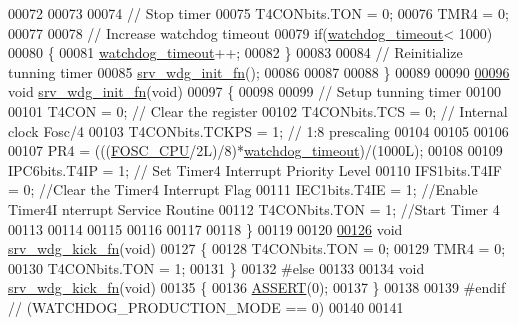 \begin{DoxyCode}
00072 
00073 
00074     \textcolor{comment}{// Stop timer}
00075     T4CONbits.TON = 0;
00076     TMR4          = 0;  
00077     
00078     \textcolor{comment}{// Increase watchdog timeout}
00079     \textcolor{keywordflow}{if}(\hyperlink{a00066_a159d343205105c86a6dec5da26cfdfe0}{watchdog\_timeout}< 1000)
00080     \{
00081         \hyperlink{a00066_a159d343205105c86a6dec5da26cfdfe0}{watchdog\_timeout}++;
00082     \}
00083 
00084     \textcolor{comment}{// Reinitialize tunning timer}
00085     \hyperlink{a00066_a37c35718860234f09b8cef8680e1cc09}{srv\_wdg\_init\_fn}();
00086 
00087     
00088 \}
00089 
00090 
\hypertarget{a00066_source_l00096}{}\hyperlink{a00066_a37c35718860234f09b8cef8680e1cc09}{00096} \textcolor{keywordtype}{void} \hyperlink{a00066_a37c35718860234f09b8cef8680e1cc09}{srv\_wdg\_init\_fn}(\textcolor{keywordtype}{void})
00097 \{
00098 
00099     \textcolor{comment}{// Setup tunning timer}
00100     
00101     T4CON = 0;                    \textcolor{comment}{// Clear the register}
00102     T4CONbits.TCS    = 0;         \textcolor{comment}{// Internal clock Fosc/4   }
00103     T4CONbits.TCKPS = 1;          \textcolor{comment}{//    1:8 prescaling    }
00104 
00105 
00106 
00107     PR4 = (((\hyperlink{a00072_a64b7f2fd4683ad3dcd74ccab1eba40d7}{FOSC\_CPU}/2L)/8)*\hyperlink{a00066_a159d343205105c86a6dec5da26cfdfe0}{watchdog\_timeout})/(1000L); 
00108     
00109     IPC6bits.T4IP = 1;            \textcolor{comment}{// Set Timer4 Interrupt Priority Level}
00110     IFS1bits.T4IF = 0;            \textcolor{comment}{//Clear the Timer4 Interrupt Flag}
00111     IEC1bits.T4IE = 1;            \textcolor{comment}{//Enable Timer4I nterrupt Service Routine}
00112     T4CONbits.TON = 1;            \textcolor{comment}{//Start Timer 4}
00113 
00114 
00115 
00116 
00117     
00118 \}
00119 
00120 
\hypertarget{a00066_source_l00126}{}\hyperlink{a00066_ac6f811346b702c404d5e6cdfb9262767}{00126} \textcolor{keywordtype}{void} \hyperlink{a00066_ac6f811346b702c404d5e6cdfb9262767}{srv\_wdg\_kick\_fn}(\textcolor{keywordtype}{void})
00127 \{
00128     T4CONbits.TON = 0;
00129     TMR4 = 0;
00130     T4CONbits.TON = 1;
00131 \}
00132 \textcolor{preprocessor}{#else}
00133 
00134 \textcolor{keywordtype}{void} \hyperlink{a00066_ac6f811346b702c404d5e6cdfb9262767}{srv\_wdg\_kick\_fn}(\textcolor{keywordtype}{void})
00135 \{
00136    \hyperlink{a00072_abb8ff8e213ac9f6fb21d2b968583b936}{ASSERT}(0);
00137 \}
00138 
00139 \textcolor{preprocessor}{#endif //  (WATCHDOG\_PRODUCTION\_MODE == 0)}
00140 
00141 
\end{DoxyCode}
